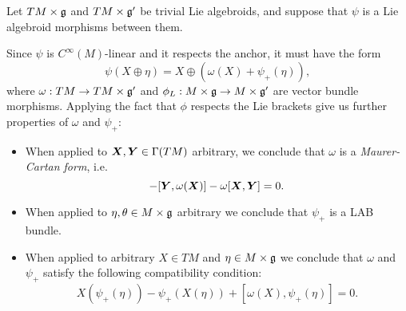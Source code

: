 \begin{example}\label{exampleLieAlgebroidMorphismsBetweenTrivialLieAlgebroids}
Let $TM \times \mathfrak{g}$ and $TM \times \mathfrak{g}'$ be trivial Lie algebroids, and suppose that $\psi$ is a Lie algebroid morphisms between them.

Since $\psi$ is $C^\infty(M)$-linear and it respects the anchor, it must have the form
\begin{equation}\label{equationFormOFGeneralMorphismTrivialLieAlgebroidsBetween}
    \psi(X \oplus \eta) = X \oplus (\omega(X) + \psi_+(\eta)),
\end{equation}
where $\omega: TM \to TM \times \mathfrak{g}'$ and $\phi_L: M \times \alg g \to M \times \alg g'$ are vector bundle morphisms.
Applying the fact that $\phi$ respects the Lie brackets give us further properties of $\omega$ and $\psi_+$:
\begin{itemize}
    
    \item When applied to $\bm{X}, \bm{Y} \in \Gamma(TM)$ arbitrary, we conclude that $\omega$ is a \textit{Maurer-Cartan form}, i.e. 
        \begin{equation}
            [\sect X, \omega(\sect Y)] - [\sect Y , \omega(\sect X)] - \omega[\sect X, \sect Y] = 0.
        \end{equation}
    
    \item When applied to $\eta, \theta \in M \times \mathfrak{g}$ arbitrary we conclude that $\psi_+$ is a LAB bundle.
    
    \item When applied to arbitrary $X \in TM$ and $\eta \in M \times \mathfrak{g}$ we conclude that $\omega$ and $\psi_+$ satisfy the following compatibility condition:
    \begin{equation}
        X(\psi_+(\eta)) - \psi_+(X(\eta)) + [\omega(X), \psi_+(\eta)] = 0.
    \end{equation}
    
\end{itemize}

\end{example}


